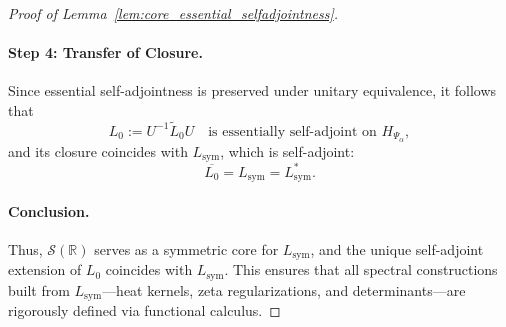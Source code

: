 \begin{proof}[Proof of Lemma~\ref{lem:core_essential_selfadjointness}]
\paragraph{Step 4: Transfer of Closure.}
Since essential self-adjointness is preserved under unitary equivalence, it follows that
\[
L_0 := U^{-1} \widetilde{L}_0 U \quad \text{is essentially self-adjoint on } H_{\Psi_\alpha},
\]
and its closure coincides with \( L_{\mathrm{sym}} \), which is self-adjoint:
\[
\overline{L_0} = L_{\mathrm{sym}} = L_{\mathrm{sym}}^*.
\]

\paragraph{Conclusion.}
Thus, \( \mathcal{S}(\mathbb{R}) \) serves as a symmetric core for \( L_{\mathrm{sym}} \), and the unique self-adjoint extension of \( L_0 \) coincides with \( L_{\mathrm{sym}} \). This ensures that all spectral constructions built from \( L_{\mathrm{sym}} \)—heat kernels, zeta regularizations, and determinants—are rigorously defined via functional calculus.
\end{proof}

